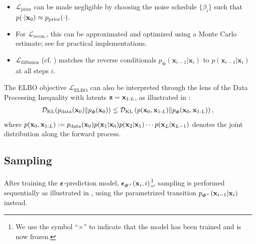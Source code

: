 \begin{itemize}
    \item $\mathcal{L}_{\text{prior}}$ can be made negligible by choosing the noise schedule $\{\beta_i\}$ such that $p(\cdot|{\mathbf{x}}_0) \approx p_{\text{prior}}(\cdot)$.
    \item For $\mathcal{L}_{\text{recon.}}$, this can be approximated and optimized using a Monte Carlo estimate; see \citep{ho2020denoising, kingma2021variational} for practical implementations. 
    \item $\mathcal{L}_{\text{diffusion}}$ (cf. ) matches the reverse conditionals $p_{\bm{\phi}}(\mathbf{x}_{i-1}|\mathbf{x}_i)$ to $p(\mathbf{x}_{i-1}|\mathbf{x}_i)$ at all steps $i$.
\end{itemize}

The ELBO objective $\mathcal{L}_{\text{ELBO}}$ can also be interpreted through the lens of the Data Processing Inequality with latents ${\mathbf{z}} = {\mathbf{x}}_{1:L}$, as illustrated in :
\begin{align*}
    \mathcal{D}_{\mathrm{KL}}(p_{\mathrm{data}}({\mathbf{x}}_0) \| p_{\bm{\phi}}({\mathbf{x}}_0)) \leq \mathcal{D}_{\mathrm{KL}}\left(p({\mathbf{x}}_0, {\mathbf{x}}_{1:L}) \| p_{\bm{\phi}}({\mathbf{x}}_0, {\mathbf{x}}_{1:L})\right),
\end{align*}
where $p({\mathbf{x}}_0, {\mathbf{x}}_{1:L}) := p_{\mathrm{data}}({\mathbf{x}}_0)  p({\mathbf{x}}_1|{\mathbf{x}}_0)  p({\mathbf{x}}_2|{\mathbf{x}}_1) \cdots p({\mathbf{x}}_L|{\mathbf{x}}_{L-1})$ denotes the joint distribution along the forward process. 








\subsection{Sampling} 
After training the ${\bm{\epsilon}}$-prediction model, $\bm{\epsilon}_{\bm{\phi}^\times}({\mathbf{x}}_i, i)$\footnote{We use the symbol ``$\times$'' to indicate that the model has been trained and is now frozen.}, sampling is performed sequentially as illustrated in , using the parametrized transition $p_{\bm{\phi}^\times}({\mathbf{x}}_{i-1} | {\mathbf{x}}_i)$ instead.


